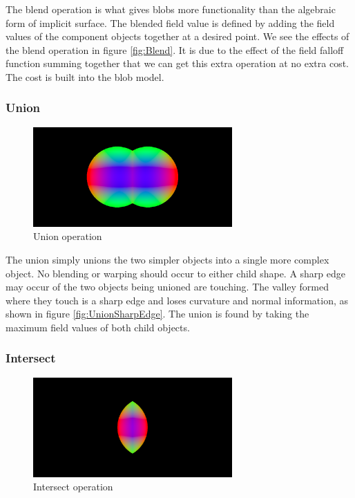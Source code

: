 \documentclass[conference]{acmsiggraph}
\begin{document}
The blend operation is what gives blobs more functionality than the algebraic
form of implicit surface. The blended field value is defined by adding the
field values of the component objects together at a desired point. We see the
effects of the blend operation in figure \ref{fig:Blend}. It is due to the
effect of the field falloff function summing together that we can get this
extra operation at no extra cost. The cost is built into the blob model.

\subsubsection{Union}
\begin{figure}[htbp]
	\centering
	\includegraphics[height=1.5in]{images/union.png}
	\caption{Union operation}
	\label{fig:Union}
\end{figure}

The union simply unions the two simpler objects into a single more complex
object. No blending or warping should occur to either child shape. A sharp edge
may occur of the two objects being unioned are touching. The valley formed
where they touch is a sharp edge and loses curvature and normal information,
as shown in figure \ref{fig:UnionSharpEdge}. The union is found by taking the
maximum field values of both child objects.


\subsubsection{Intersect}
\begin{figure}[htbp]
	\centering
	\includegraphics[height=1.5in]{images/intersect.png}
	\caption{Intersect operation}
	\label{fig:Intersection}
\end{figure}
\end{document}
